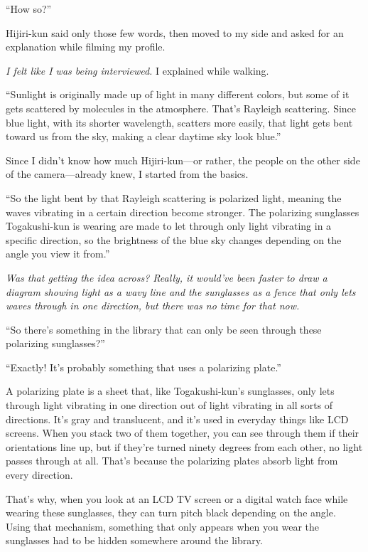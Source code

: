 \documentclass[
    a4paper,
    12pt,
    twoside,
    openany,
    UTF8,
    fontset=windows
]{ctexbook}
\begin{document}
``How so?''

Hijiri-kun said only those few words, then moved to my side and asked for an explanation while filming my profile.

\textit{I felt like I was being interviewed.} I explained while walking.

``Sunlight is originally made up of light in many different colors, but some of it gets scattered by molecules in the atmosphere. That's Rayleigh scattering. Since blue light, with its shorter wavelength, scatters more easily, that light gets bent toward us from the sky, making a clear daytime sky look blue.''

Since I didn't know how much Hijiri-kun---or rather, the people on the other side of the camera---already knew, I started from the basics.

``So the light bent by that Rayleigh scattering is polarized light, meaning the waves vibrating in a certain direction become stronger. The polarizing sunglasses Togakushi-kun is wearing are made to let through only light vibrating in a specific direction, so the brightness of the blue sky changes depending on the angle you view it from.''

\textit{Was that getting the idea across? Really, it would've been faster to draw a diagram showing light as a wavy line and the sunglasses as a fence that only lets waves through in one direction, but there was no time for that now.}

``So there's something in the library that can only be seen through these polarizing sunglasses?''

``Exactly! It's probably something that uses a polarizing plate.''

A polarizing plate is a sheet that, like Togakushi-kun's sunglasses, only lets through light vibrating in one direction out of light vibrating in all sorts of directions. It's gray and translucent, and it's used in everyday things like LCD screens. When you stack two of them together, you can see through them if their orientations line up, but if they're turned ninety degrees from each other, no light passes through at all. That's because the polarizing plates absorb light from every direction.

That's why, when you look at an LCD TV screen or a digital watch face while wearing these sunglasses, they can turn pitch black depending on the angle. Using that mechanism, something that only appears when you wear the sunglasses had to be hidden somewhere around the library.
\end{document}

